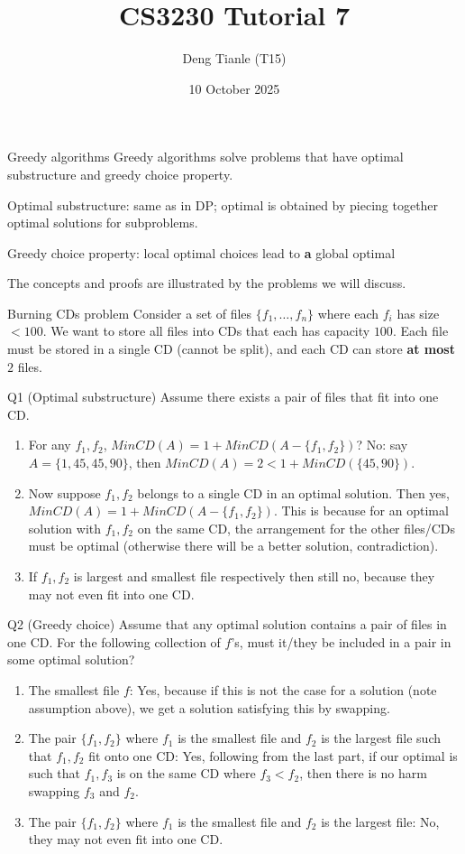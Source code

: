 \documentclass[t]{beamer}
\title{CS3230 Tutorial 7}
\author{Deng Tianle (T15)}
\date{10 October 2025}
\begin{document}
\frame{\titlepage} 

\begin{frame}{Greedy algorithms}
  Greedy algorithms solve problems that have optimal substructure and greedy choice property. 
  \par Optimal substructure: same as in DP; optimal is obtained by piecing together optimal solutions for subproblems. 
  \par Greedy choice property: local optimal choices lead to \textbf{a} global optimal
  \par The concepts and proofs are illustrated by the problems we will discuss. 
\end{frame}
\begin{frame}{Burning CDs problem}
  Consider a set of files $\{f_1, \dots, f_n\}$ where each $f_i$ has size $<100$. We want to store all files into CDs that each has capacity $100$. Each file must be stored in a single CD (cannot be split), and each CD can store \textbf{at most $2$} files. 
\end{frame}
\begin{frame}{Q1 (Optimal substructure)}
  Assume there exists a pair of files that fit into one CD. 
  \begin{enumerate}
    \item For any $f_1, f_2$, $MinCD(A) = 1 + MinCD(A-\{f_1, f_2\})$? No: say $A = \{1, 45, 45, 90\}$, then $MinCD(A)=2 < 1+MinCD(\{45, 90\})$. 
    \item Now suppose $f_1, f_2$ belongs to a single CD in an optimal solution. Then yes, $MinCD(A) = 1 + MinCD(A-\{f_1, f_2\})$. This is because for an optimal solution with $f_1, f_2$ on the same CD, the arrangement for the other files/CDs must be optimal (otherwise there will be a better solution, contradiction). 
    \item If $f_1, f_2$ is largest and smallest file respectively then still no, because they may not even fit into one CD. 
  \end{enumerate}
\end{frame}
\begin{frame}{Q2 (Greedy choice)}
  Assume that any optimal solution contains a pair of files in one CD. For the following collection of $f$'s, must it/they be included in a pair in some optimal solution?
  \begin{enumerate}
    \item The smallest file $f$: Yes, because if this is not the case for a solution (note assumption above), we get a solution satisfying this by swapping. 
    \item The pair $\{f_1, f_2\}$ where $f_1$ is the smallest file and $f_2$ is the largest file such that $f_1, f_2$ fit onto one CD: Yes, following from the last part, if our optimal is such that $f_1, f_3$ is on the same CD where $f_3<f_2$, then there is no harm swapping $f_3$ and $f_2$. 
    \item The pair $\{f_1, f_2\}$ where $f_1$ is the smallest file and $f_2$ is the largest file: No, they may not even fit into one CD. 
  \end{enumerate}
\end{frame}
\end{document}
